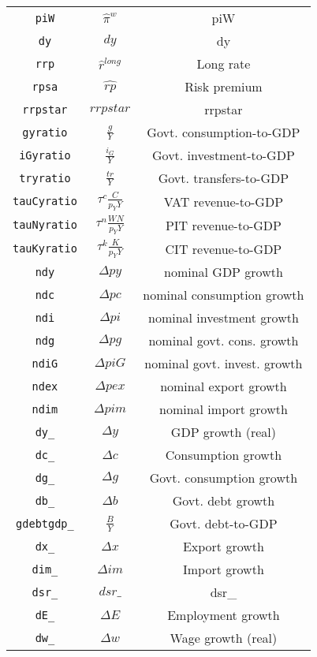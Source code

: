 \begin{center}
\begin{longtable}{ccc}
\texttt{piW} & $\hat{\pi}^w$ & piW\\
\texttt{dy} & $dy$ & dy\\
\texttt{rrp} & $\hat{r}^{long}$ & Long rate\\
\texttt{rpsa} & $\hat{rp}$ & Risk premium\\
\texttt{rrpstar} & $rrpstar$ & rrpstar\\
\texttt{gyratio} & $\frac{g}{Y}$ & Govt. consumption-to-GDP\\
\texttt{iGyratio} & $\frac{{i}_G}{Y}$ & Govt. investment-to-GDP\\
\texttt{tryratio} & $\frac{tr}{Y}$ & Govt. transfers-to-GDP\\
\texttt{tauCyratio} & ${{\tau}^{c}}\frac{C}{{p_{Y}}Y}$ & VAT revenue-to-GDP\\
\texttt{tauNyratio} & ${{\tau}^{n}}\frac{WN}{{p_{Y}}Y}$ & PIT revenue-to-GDP\\
\texttt{tauKyratio} & ${{\tau}^{k}}\frac{K}{{p_{Y}}Y}$ & CIT revenue-to-GDP\\
\texttt{ndy} & $\Delta{py}$ & nominal GDP growth\\
\texttt{ndc} & $\Delta{pc}$ & nominal consumption growth\\
\texttt{ndi} & $\Delta{pi}$ & nominal investment growth\\
\texttt{ndg} & $\Delta{pg}$ & nominal govt. cons. growth\\
\texttt{ndiG} & $\Delta{piG}$ & nominal govt. invest. growth\\
\texttt{ndex} & $\Delta{pex}$ & nominal export growth\\
\texttt{ndim} & $\Delta{pim}$ & nominal import growth\\
\texttt{dy\_} & $\Delta{y}$ & GDP growth (real)\\
\texttt{dc\_} & $\Delta{c}$ & Consumption growth\\
\texttt{dg\_} & $\Delta{g}$ & Govt. consumption growth\\
\texttt{db\_} & $\Delta{b}$ & Govt. debt growth\\
\texttt{gdebtgdp\_} & $\frac{B}{Y}$ & Govt. debt-to-GDP\\
\texttt{dx\_} & $\Delta{x}$ & Export growth\\
\texttt{dim\_} & $\Delta{im}$ & Import growth\\
\texttt{dsr\_} & $dsr\_$ & dsr\_\\
\texttt{dE\_} & $\Delta{E}$ & Employment growth\\
\texttt{dw\_} & $\Delta{w}$ & Wage growth (real)\\

\end{longtable}
\end{center}

